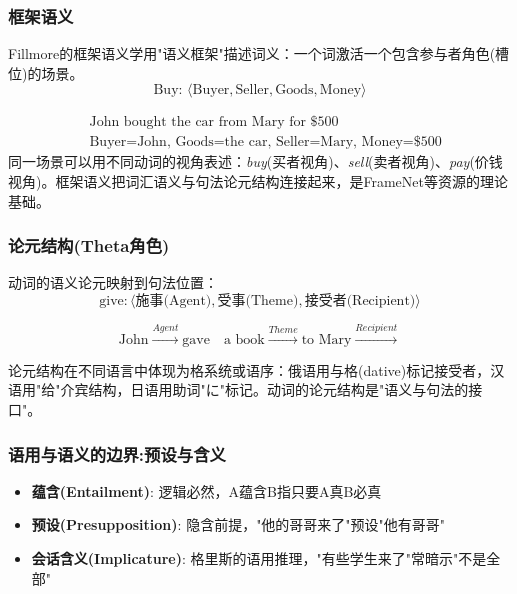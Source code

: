 \subsubsection{框架语义}

Fillmore的框架语义学用"语义框架"描述词义：一个词激活一个包含参与者角色(槽位)的场景。
\begin{equation}
    \text{Buy: } \langle \text{Buyer}, \text{Seller}, \text{Goods}, \text{Money} \rangle
\end{equation}

\begin{example}
\begin{align}
    &\text{John bought the car from Mary for \$500} \\
    &\text{Buyer=John, Goods=the car, Seller=Mary, Money=\$500}
\end{align}
同一场景可以用不同动词的视角表述：\emph{buy}(买者视角)、\emph{sell}(卖者视角)、\emph{pay}(价钱视角)。框架语义把词汇语义与句法论元结构连接起来，是FrameNet等资源的理论基础。
\end{example}

\subsubsection{论元结构(Theta角色)}

动词的语义论元映射到句法位置：
\begin{equation}
    \text{give}: \langle \text{施事(Agent)}, \text{受事(Theme)}, \text{接受者(Recipient)} \rangle
\end{equation}

\begin{equation}
    \text{John} \xrightarrow{Agent} \text{gave} \quad \text{a book} \xrightarrow{Theme} \text{to Mary} \xrightarrow{Recipient}
\end{equation}

论元结构在不同语言中体现为格系统或语序：俄语用与格(dative)标记接受者，汉语用"给"介宾结构，日语用助词"に"标记。动词的论元结构是"语义与句法的接口"。

\subsubsection{语用与语义的边界:预设与含义}

\begin{itemize}
    \item \textbf{蕴含(Entailment)}: 逻辑必然，A蕴含B指只要A真B必真
    \item \textbf{预设(Presupposition)}: 隐含前提，"他的哥哥来了"预设"他有哥哥"
    \item \textbf{会话含义(Implicature)}: 格里斯的语用推理，"有些学生来了"常暗示"不是全部"
\end{itemize}

